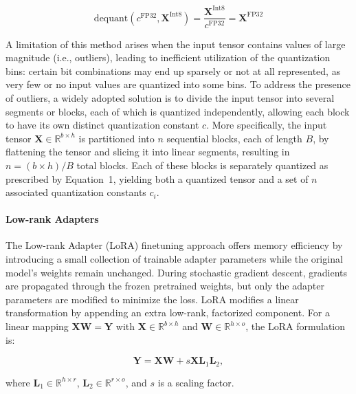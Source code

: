 \begin{equation}
    \text{dequant}(c^{\text{FP32}}, \mathbf{X}^{\text{Int8}}) = \frac{\mathbf{X}^{\text{Int8}}}{c^{\text{FP32}}} = \mathbf{X}^{\text{FP32}}
\end{equation}

A limitation of this method arises when the input tensor contains values of large magnitude (i.e., outliers), leading to inefficient utilization of the quantization bins: certain bit combinations may end up sparsely or not at all represented, as very few or no input values are quantized into some bins. To address the presence of outliers, a widely adopted solution is to divide the input tensor into several segments or blocks, each of which is quantized independently, allowing each block to have its own distinct quantization constant $c$. More specifically, the input tensor $\mathbf{X}\in \mathbb{R}^{b\times h}$ is partitioned into $n$ sequential blocks, each of length $B$, by flattening the tensor and slicing it into linear segments, resulting in ${n = ({b\times h} )/{B} }$ total blocks. Each of these blocks is separately quantized as prescribed by Equation~1, yielding both a quantized tensor and a set of $n$ associated quantization constants $c_i$.

\paragraph{Low-rank Adapters} The Low-rank Adapter (LoRA) finetuning approach \citep{hu2021lora} offers memory efficiency by introducing a small collection of trainable adapter parameters while the original model’s weights remain unchanged. During stochastic gradient descent, gradients are propagated through the frozen pretrained weights, but only the adapter parameters are modified to minimize the loss. LoRA modifies a linear transformation by appending an extra low-rank, factorized component. For a linear mapping ${\mathbf{X} \mathbf{W} = \mathbf{Y}}$ with $\mathbf{X}\in  \mathbb{R}^{b\times h}$ and $\mathbf{W}\in  \mathbb{R}^{h\times o}$, the LoRA formulation is:

\begin{equation}
    \mathbf{Y} = \mathbf{X}\mathbf{W} + s\mathbf{X}\mathbf{L}_1\mathbf{L}_2,
\end{equation}

where $\mathbf{L}_1\in  \mathbb{R}^{h\times r}$, $\mathbf{L}_2\in  \mathbb{R}^{r\times o}$, and $s$ is a scaling factor.

